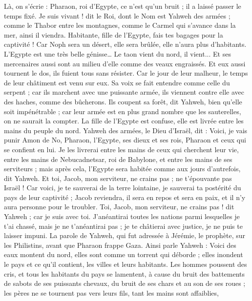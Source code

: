 \begin{multicols}{2}
Là, on s’écrie : Pharaon, roi d’Egypte, ce n'est qu’un bruit ; il a laissé passer le temps fixé.
Je suis vivant ! dit le Roi, dont le Nom est Yahweh des armées ; comme le Thabor entre les montagnes, comme le Carmel qui s’avance dans la mer, ainsi il viendra.
Habitante, fille de l'Egypte, fais tes bagages pour la captivité ! Car Noph sera un désert, elle sera brûlée, elle n’aura plus d'habitants.
L'Egypte est une très belle génisse… Le taon vient du nord, il vient...
Et ses mercenaires aussi sont au milieu d’elle comme des veaux engraissés. Et eux aussi tournent le dos, ils fuient tous sans résister. Car le jour de leur malheur, le temps de leur châtiment est venu sur eux.
Sa voix se fait entendre comme celle du serpent ; car ils marchent avec une puissante armée, ils viennent contre elle avec des haches, comme des bûcherons.
Ils coupent sa forêt, dit Yahweh, bien qu’elle soit impénétrable ; car leur armée est en plus grand nombre que les sauterelles, on ne saurait la compter.
La fille de l’Egypte est confuse, elle est livrée entre les mains du peuple du nord.
Yahweh des armées, le Dieu d'Israël, dit : Voici, je vais punir Amon de No, Pharaon, l'Egypte, ses dieux et ses rois, Pharaon et ceux qui se confient en lui.
Je les livrerai entre les mains de ceux qui cherchent leur vie, entre les mains de Nebucadnetsar, roi de Babylone, et entre les mains de ses serviteurs ; mais après cela, l’Egypte sera habitée comme aux jours d’autrefois, dit Yahweh.
Et toi, Jacob, mon serviteur, ne crains pas ; ne t’épouvante pas Israël ! Car voici, je te sauverai de la terre lointaine, je sauverai ta postérité du pays de leur captivité ; Jacob reviendra, il sera en repos et sera en paix, et il n'y aura personne pour le troubler.
Toi, Jacob, mon serviteur, ne crains pas ! dit Yahweh ; car je suis avec toi. J’anéantirai toutes les nations parmi lesquelles je t'ai chassé, mais je ne t’anéantirai pas ; je te châtierai avec justice, je ne puis te laisser impuni.
\VerseOne{}La parole de Yahweh, qui fut adressée à Jérémie, le prophète, sur les Philistins, avant que Pharaon frappe Gaza.
Ainsi parle Yahweh : Voici des eaux montent du nord, elles sont comme un torrent qui déborde ; elles inondent le pays et ce qu’il contient, les villes et leurs habitants. Les hommes poussent des cris, et tous les habitants du pays se lamentent,
à cause du bruit des battements de sabots de ses puissants chevaux, du bruit de ses chars et au son de ses roues ; les pères ne se tournent pas vers leurs fils, tant les mains sont affaiblies,

\end{multicols}
